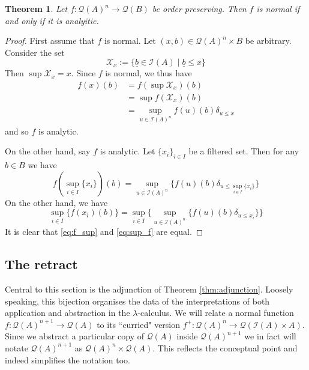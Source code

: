 \documentclass[12pt]{article}
\theoremstyle{plain}
\newtheorem{thm}{Theorem}[subsection] %
\theoremstyle{definition}
\newcommand{\scr}[1]{\mathscr{#1}}
\newcommand{\call}[1]{\mathcal{#1}}
\newcommand{\Ical}{\call{I}}
\newcommand{\Qcal}{\call{Q}}
\newcommand{\lto}{\longrightarrow}
\begin{document}
\begin{thm}\label{thm:normal_analytic}
	Let $f: \Qcal(A)^n \lto \Qcal(B)$ be order preserving. Then $f$ is normal if and only if it is analyitic.
	\end{thm}
\begin{proof}
	First assume that $f$ is normal. Let $(x,b) \in \Qcal(A)^n \times B$ be arbitrary. Consider the set
	\begin{equation}
		\scr{X}_x := \{ \underline{b} \in \Ical(A) \mid \underline{b} \leq x \}
		\end{equation}
	Then $\operatorname{sup} \scr{X}_x = x$. Since $f$ is normal, we thus have
	\begin{align*}
		f(x)(b) &= f(\operatorname{sup}\scr{X}_x)(b)\\
		&= \operatorname{sup}f(\scr{X}_x)(b)\\
		&= \operatorname{sup}_{u \in \Ical(A)^n}f(u)(b)\delta_{u \leq x}
		\end{align*}
	and so $f$ is analytic.
	
	On the other hand, say $f$ is analytic. Let $\{ x_i \}_{i \in I}$ be a filtered set. Then for any $b \in B$ we have
	\begin{equation}\label{eq:f_sup}
		f(\operatorname{sup}_{i \in I}\{ x_i \})(b) = \operatorname{sup}_{u \in \Ical(A)^n}\big\{f(u)(b)\delta_{u \leq \operatorname{sup}_{i \in I}\{ x_i \}}\big\}
		\end{equation}
	On the other hand, we have
	\begin{equation}\label{eq:sup_f}
		\operatorname{sup}_{i \in I}\{ f(x_i)(b) \} = \operatorname{sup}_{i \in I}\big\{ \operatorname{sup}_{u \in \Ical(A)^n}\{ f(u)(b)\delta_{u \leq x_i}\} \big\}
		\end{equation}
	It is clear that \eqref{eq:f_sup} and \eqref{eq:sup_f} are equal.
	\end{proof}
	
	\subsection{The retract}
	Central to this section is the adjunction of Theorem \ref{thm:adjunction}. Loosely speaking, this bijection organises the data of the interpretations of both application and abstraction in the $\lambda$-calculus. We will relate a normal function $f: \Qcal(A)^{n+1} \lto \Qcal(A)$ to its ``curried" version $f^+: \Qcal(A)^n \lto \Qcal(\Ical(A) \times A)$. Since we abstract a particular copy of $\Qcal(A)$ inside $\Qcal(A)^{n+1}$ we in fact will notate $\Qcal(A)^{n+1}$ as $\Qcal(A)^n \times \Qcal(A)$. This reflects the conceptual point and indeed simplifies the notation too.
	
\end{document}
